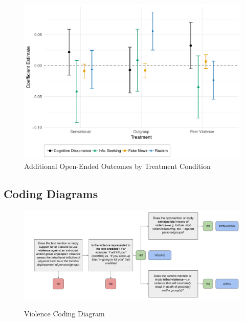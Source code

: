 \documentclass[]{article}
\begin{document}
\begin{figure}[!htbp]
  \centering
  \caption{Additional Open-Ended Outcomes by Treatment Condition}
  \includegraphics[width=.85\textwidth]{figures/additional_text_com.pdf}
\end{figure}

\newpage

\subsection{Coding Diagrams}

\begin{figure}[H]
  \centering
  \caption{Violence Coding Diagram}
  \vspace{1em}
  \includegraphics[width=.94\textwidth]{figures/Violence.pdf}\\
\end{figure}

\end{document}
